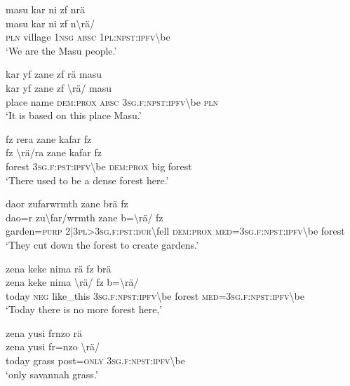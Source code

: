 \ea\label{ex:2:a1669}
masu kar ni zf nrä\\
\gll masu	kar	ni	zf	n{\textbackslash}rä/\\
     \textsc{pln}	village	1\textsc{nsg}	\textsc{absc}	1\textsc{pl}:\textsc{npst}:\textsc{ipfv}{\textbackslash}be\\
\glt `We are the Masu people.'
\z

\ea\label{ex:2:a1670}
kar yf zane zf rä masu\\
\gll kar	yf	zane	zf	{\textbackslash}rä/	masu\\
     place	name	\textsc{dem}:\textsc{prox}	\textsc{absc}	3\textsc{sg}.\textsc{f}:\textsc{npst}:\textsc{ipfv}{\textbackslash}be	\textsc{pln}\\
\glt `It is based on this place Masu.'
\z

\ea\label{ex:2:a1671}
fz rera zane kafar fz\\
\gll fz	{\textbackslash}rä/ra	zane	kafar	fz\\
     forest	3\textsc{sg}.\textsc{f}:\textsc{pst}:\textsc{ipfv}{\textbackslash}be	\textsc{dem}:\textsc{prox}	big	forest\\
\glt `There used to be a dense forest here.'
\z

\ea\label{ex:2:a1672}
daor zufarwrmth zane brä fz\\
\gll dao=r	zu{\textbackslash}far/wrmth	zane	b={\textbackslash}rä/	fz\\
     garden=\textsc{purp}	2|3\textsc{pl}>3\textsc{sg}.\textsc{f}:\textsc{pst}:\textsc{dur}{\textbackslash}fell	\textsc{dem}:\textsc{prox}	\textsc{med}=3\textsc{sg}.\textsc{f}:\textsc{npst}:\textsc{ipfv}{\textbackslash}be	forest\\
\glt `They cut down the forest to create gardens.'
\z

\ea\label{ex:2:a1674}
zena keke nima rä fz brä\\
\gll zena	keke	nima	{\textbackslash}rä/	fz	b={\textbackslash}rä/\\
     today	\textsc{neg}	like\_this	3\textsc{sg}.\textsc{f}:\textsc{npst}:\textsc{ipfv}{\textbackslash}be	forest	\textsc{med}=3\textsc{sg}.\textsc{f}:\textsc{npst}:\textsc{ipfv}{\textbackslash}be\\
\glt `Today there is no more forest here,'
\z

\ea\label{ex:2:a1675}
zena yusi frnzo rä\\
\gll zena	yusi	fr=nzo	{\textbackslash}rä/\\
     today	grass	post=\textsc{only}	3\textsc{sg}.\textsc{f}:\textsc{npst}:\textsc{ipfv}{\textbackslash}be\\
\glt `only savannah grass.'
\z

